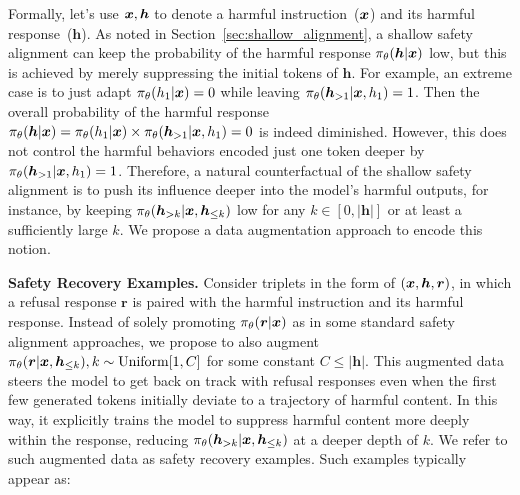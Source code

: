 Formally, let's use $\bm{x}, \bm{h}$ to denote a harmful instruction~($\bm{x}$) and its harmful response~($\bm{h}$). As noted in Section~\ref{sec:shallow_alignment}, a shallow safety alignment can keep the probability of the harmful response $\pi_{\theta}(\bm{h}|\bm{x})$ low, but this is achieved by merely suppressing the initial tokens of $\bm{h}$. For example, an extreme case is to just adapt $\pi_{\theta}(h_1 |\bm{x}) = 0$ while leaving $\pi_{\theta}(\bm{h}_{>1}|\bm{x}, h_1) = 1$. Then the overall probability of the harmful response $\pi_{\theta}(\bm{h}|\bm{x}) = \pi_{\theta}(h_1 |\bm{x}) \times \pi_{\theta}(\bm{h}_{>1}|\bm{x}, h_1) = 0$ is indeed diminished. However, this does not control the harmful behaviors encoded just one token deeper by $\pi_{\theta}(\bm{h}_{>1}|\bm{x}, h_1) = 1$. Therefore, a natural counterfactual of the shallow safety alignment is to push its influence deeper into the model's harmful outputs, for instance, by keeping $\pi_{\theta}(\bm{h}_{> k}|\bm{x}, \bm{h}_{\le k})$ low for any $k \in [0, |\bm{h}|]$ or at least a sufficiently large $k$. We propose a data augmentation approach to encode this notion. 



\textbf{Safety Recovery Examples.} Consider triplets in the form of $(\bm{x}, \bm{h}, \bm{r})$, in which a refusal response $\bm{r}$ is paired with the harmful instruction and its harmful response. Instead of solely promoting $\pi_{\theta}(\bm{r} | \bm{x})$ as in some standard safety alignment approaches, we propose to also augment $\pi_{\theta}(\bm{r} | \bm{x}, \bm{h}_{\le k}), k\sim \text{Uniform}[1, C]$ for some constant $C \le |\bm{h}|$. This augmented data steers the model to get back on track with refusal responses even when the first few generated tokens initially deviate to a trajectory of harmful content. In this way, it explicitly trains the model to suppress harmful content more deeply within the response, reducing $\pi_{\theta}(\bm{h}_{> k} | \bm{x}, \bm{h}_{\le k})$ at a deeper depth of $k$. We refer to such augmented data as safety recovery examples. Such examples typically appear as:

\noindent{}

